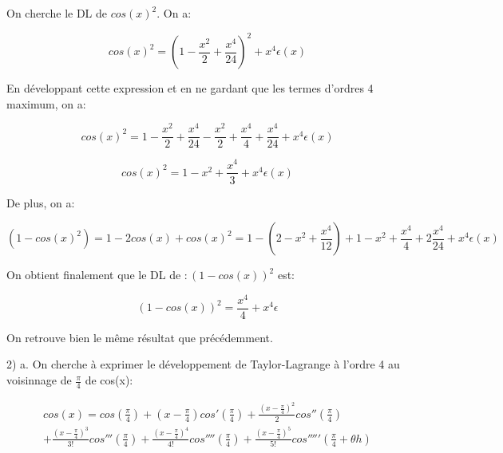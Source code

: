 \documentclass[12pt,a4paper, french]{article}
\begin{document}
On cherche le DL de \begin{math}
    cos(x)^2\end{math}. On a:

    \begin{center}
        \begin{equation*}
            cos(x)^2=(1-\frac{x^2}{2}+\frac{x^4}{24})^2+x^4\epsilon(x)
        \end{equation*}
    \end{center}

En développant cette expression et en ne gardant que les termes d'ordres 4 maximum, on a:
\begin{center}
    \begin{equation*}
        cos(x)^2=1-\frac{x^2}{2}+\frac{x^4}{24}-\frac{x^2}{2}+\frac{x^4}{4}+\frac{x^4}{24}+x^4\epsilon(x)
    \end{equation*}
\end{center}
\begin{center}
    \begin{equation*}
        cos(x)^2=1-x^2+\frac{x^4}{3}+x^4\epsilon(x)
    \end{equation*}
\end{center}

De plus, on a:
\begin{center}
    \begin{equation*}
        (1-cos(x)^2)=1-2cos(x)+cos(x)^2=1-(2-x^2+\frac{x^4}{12})+1-x^2+\frac{x^4}{4}+2\frac{x^4}{24}+x^4\epsilon(x)
    \end{equation*}
\end{center}

On obtient finalement que le DL de \begin{math}:(1-cos(x))^2\end{math} est:
\begin{center}
    \begin{equation*}
    (1-cos(x))^2=\frac{x^4}{4}+x^4\epsilon
    \end{equation*}
\end{center}

On retrouve bien le même résultat que précédemment.

2) a. On cherche à exprimer le développement de Taylor-Lagrange à l'ordre 4 au voisinnage de \begin{math}
    \frac{\pi}{4}
\end{math} de cos(x):
\begin{center}
    \begin{multline*}
        cos(x)=cos(\frac{\pi}{4})+(x-\frac{\pi}{4})cos'(\frac{\pi}{4})+\frac{(x-\frac{\pi}{4})^2}{2}cos''(\frac{\pi}{4}) \\
        +\frac{(x-\frac{\pi}{4})^3}{3!}cos'''(\frac{\pi}{4})+\frac{(x-\frac{\pi}{4})^4}{4!}cos''''(\frac{\pi}{4})+\frac{(x-\frac{\pi}{4})^5}{5!}cos'''''(\frac{\pi}{4}+\theta h)
    \end{multline*}
\end{center}
\end{document}
